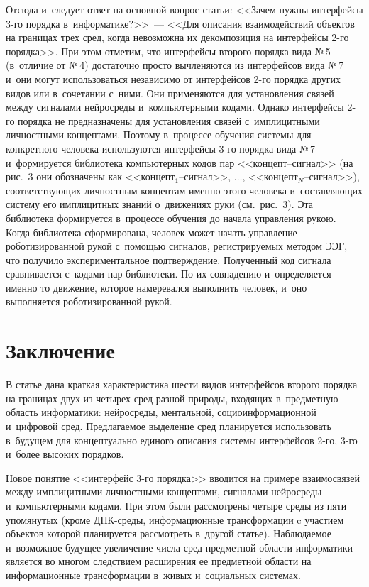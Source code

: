 \begin{multicols}{2}
Отсюда и~следует ответ на 
основной вопрос статьи: <<Зачем нужны интерфейсы 3-го порядка 
в~информатике?>>~--- <<Для описания взаимодействий объектов на границах 
трех сред, когда невозможна их декомпозиция на интерфейсы 2-го порядка>>. 
  При этом отметим, что интерфейсы второго порядка вида №\,5 (в~отличие от 
№\,4) достаточно прос\-то вычленяются из интерфейсов вида №\,7 и~они могут 
использоваться независимо от интерфейсов 2-го порядка других видов или 
в~сочетании с~ними. Они применяются для установления связей между сигналами 
нейросреды и~компьютерными кодами. Однако интерфейсы 2-го порядка не 
предназначены для установления связей с~имплицитными личностными 
концептами. Поэтому в~процессе обучения системы для конкретного человека 
используются интерфейсы 3-го порядка вида №\,7 и~формируется библиотека 
компьютерных кодов пар <<кон\-цепт--сиг\-нал>> (на рис.~3 они обозначены 
как <<кон\-цепт$_1$--сиг\-нал>>, $\ldots$, <<кон\-цепт$_N$--сиг\-нал>>), 
соответствующих личностным концептам именно этого человека 
и~составляющих систему его имплицитных знаний о~движениях руки (см.\ рис.~3). 
Эта библиотека формируется в~процессе обучения до начала управ\-ле\-ния рукою. 
Когда библиотека сформирована, человек может начать управ\-ле\-ние 
роботизированной рукой с~по\-мощью сигналов, ре\-гист\-ри\-ру\-емых методом ЭЭГ, 
что получило экспериментальное подтверждение. Полученный код сигнала 
сравнивается с~кодами пар биб\-лио\-те\-ки. По их совпадению и~определяется 
именно то движение, которое намеревался выполнить человек, и~оно 
выполняется роботизированной рукой.

\vspace*{-6pt}
  
\section{Заключение}

\vspace*{-4pt}
    
  В статье дана краткая характеристика шести видов интерфейсов второго 
порядка на границах двух из четырех сред разной природы, входящих 
в~предметную область информатики: нейросреды, ментальной,  
со\-цио\-ин\-фор\-ма\-ци\-он\-ной и~цифровой сред. Предлагаемое выделение 
сред планируется использовать в~будущем для концептуально единого 
описания системы интерфейсов 2-го, 3-го и~более высоких порядков.
  
  Новое понятие <<интерфейс 3-го порядка>> вводится на примере 
взаимосвязей между имплицитными личностными концептами, сигналами 
нейросреды и~компьютерными кодами. При этом\linebreak
 были рассмотрены четыре 
среды из пяти упомянутых (кроме ДНК-сре\-ды, информационные 
трансформации c участием объектов которой планируется рассмотреть в~другой 
статье). Наблюдаемое и~возможное будущее увеличение числа сред предметной 
области информатики является во многом следствием расширения ее 
предметной области на информационные трансформации в~живых 
и~социальных системах.
  

\end{multicols}
